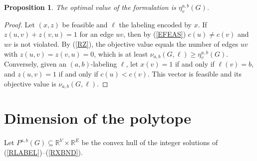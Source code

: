 \documentclass[a4paper,11pt]{article}
\newcommand{\Eb}{\overline{E}}
\newcommand{\etav}{\eta_v^{a,b}}
\newtheorem{prop}{Proposition}
\theoremstyle{definition}
\begin{document}
\begin{prop}
The optimal value of the formulation is $\etav(G)$.
\end{prop}
\begin{proof}
Let $(x,z)$ be feasible and $\ell$ the labeling encoded by $x$. If $z(u,v) + z(v,u) = 1$ for an edge $uv$, then
by (\ref{EFEAS}) $c(u) \neq c(v)$ and $uv$ is not violated. By (\ref{RZ}), the objective value equals the number of edges
$uv$ with $z(u,v) = z(v,u) = 0$, which is at least $\nu_{a,b}(G,\ell) \geq \etav(G)$.
Conversely, given an $(a,b)$-labeling $\ell$, let $x(v) = 1$ if and only if $\ell(v) = b$, and $z(u,v) = 1$ if and only if
$c(u) < c(v)$. This vector is feasible and its objective value is $\nu_{a,b}(G,\ell)$.
\end{proof}

\section{Dimension of the polytope}

Let $P^{a,b}(G) \subseteq \mathbb{R}^{V} \times \mathbb{R}^{\Eb}$ be the convex hull of the integer solutions of
(\ref{RLABEL})--(\ref{RXBND}).
\end{document}

